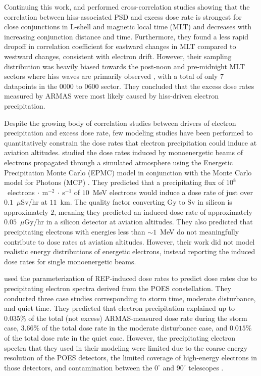 \documentclass[draft]{agujournal2019}
\newcommand{\mathdeg}{^\circ}
\newcommand{\ugy}{$\mu$Gy}
\begin{document}
Continuing this work,  and  performed cross-correlation studies showing that the correlation between hiss-associated PSD and excess dose rate is strongest for close conjunctions in L-shell and magnetic local time (MLT) and decreases with increasing conjunction distance and time. Furthermore, they found a less rapid dropoff in correlation coefficient for eastward changes in MLT compared to westward changes, consistent with electron drift. However, their sampling distribution was heavily biased towards the post-noon and pre-midnight MLT sectors where hiss waves are primarily observed \cite{dong2024, hartley2018, li2015}, with a total of only $7$ datapoints in the 0000 to 0600 sector. They concluded that the excess dose rates measured by ARMAS were most likely caused by hiss-driven electron precipitation.

Despite the growing body of correlation studies between drivers of electron precipitation and excess dose rate, few modeling studies have been performed to quantitatively constrain the dose rates that electron precipitation could induce at aviation altitudes.  studied the dose rates induced by monoenergetic beams of electrons propagated through a simulated atmosphere using the Energetic Precipitation Monte Carlo (EPMC) model \cite{lehtinen1999} in conjunction with the Monte Carlo model for Photons (MCP) \cite{xu2012}. They predicted that a precipitating flux of $10^8$~electrons$~\cdot~$m$^{-2}~\cdot~$s$^{-1}$ of $10$~MeV electrons would induce a dose rate of just over $0.1$~$\mu$Sv/hr at $11$~km. The quality factor converting Gy to Sv in silicon is approximately $2$, meaning they predicted an induced dose rate of approximately $0.05$~{\ugy}/hr in a silicon detector at aviation altitudes. They also predicted that precipitating electrons with energies less than $\sim 1$~MeV do not meaningfully contribute to dose rates at aviation altitudes. However, their work did not model realistic energy distributions of energetic electrons, instead reporting the induced dose rates for single monoenergetic beams.

 used the  parameterization of REP-induced dose rates to predict dose rates due to precipitating electron spectra derived from the POES constellation. They conducted three case studies corresponding to storm time, moderate disturbance, and quiet time. They predicted that electron precipitation explained up to $0.035\%$ of the total (not excess) ARMAS-measured dose rate during the storm case, $3.66\%$ of the total dose rate in the moderate disturbance case, and $0.015\%$ of the total dose rate in the quiet case. However, the precipitating electron spectra that they used in their modeling were limited due to the coarse energy resolution of the POES detectors, the limited coverage of high-energy electrons in those detectors, and contamination between the $0\mathdeg$ and $90\mathdeg$ telescopes \cite{selesnick2020}.
\end{document}
